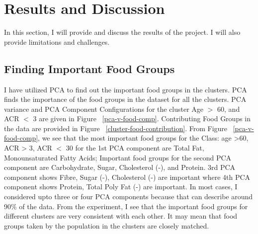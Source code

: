 \section {Results and Discussion}
In this section, I will provide and discuss the results of the project. I will also provide limitations and challenges.

\subsection{Finding Important Food Groups}
\flushleft \justifying I have utilized PCA to find out the important food groups in the clusters. PCA finds the importance of the food groups in the dataset for all the clusters. PCA variance and PCA Component Configurations for the cluster Age $>$ 60, and ACR $<$ 3 are given in Figure ~\ref{pca-v-food-comp}. Contributing Food Groups in the data are provided in Figure ~\ref{cluster-food-contribution}. From Figure ~\ref{pca-v-food-comp}, we see that the most important food groups for the Class: age >60, ACR > 3, ACR $<$ 30 for the 1st PCA component are Total Fat, Monounsaturated Fatty Acids; Important food groups for the second PCA component are Carbohydrate, Sugar, Cholesterol (-), and Protein. 3rd PCA component shows Fibre, Sugar (-), Cholesterol (-) are important where 4th PCA component shows Protein, Total Poly Fat (-) are important. In most cases, I considered upto three or four PCA components because that can describe around 90\% of the data. From the experiment, I see that the important food groups for different clusters are very consistent with each other. It may mean that food groups taken by the population in the clusters are closely matched.

